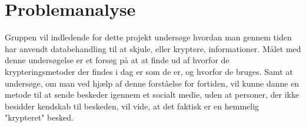 \section{Problemanalyse}
Gruppen vil indledende for dette projekt undersøge hvordan man gennem tiden har anvendt databehandling til at skjule, eller kryptere, informationer. Målet med denne undersøgelse er et forsøg på at at finde ud af hvorfor de krypteringsmetoder der findes i dag er som de er, og hvorfor de bruges. 
Samt at undersøge, om man ved hjælp af denne forståelse for fortiden, vil kunne danne en metode til at sende beskeder igennem et socialt medie, uden at personer, der ikke besidder kendskab til beskeden, vil vide, at det faktisk er en hemmelig "krypteret" besked.

\newpage


\newpage

\newpage

\newpage

\newpage